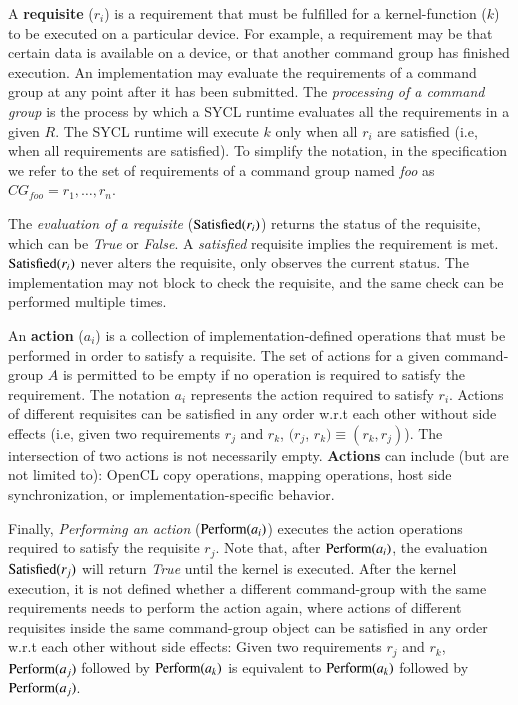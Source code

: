 A \textbf{requisite} ($r_i$) is a requirement that must be fulfilled for
a kernel-function ($k$) to be executed on a particular device.
For example, a requirement may be that certain data is available on a
device, or that another command group has finished execution.
An implementation may evaluate the requirements of a command group at any
point after it has been submitted. 
The \textit{processing of a command group} is the process by which a SYCL
runtime evaluates all the requirements in a given $R$.
The SYCL runtime will execute $k$ only when all $r_i$ are satisfied (i.e, 
when all requirements are satisfied). 
To simplify the notation, in the specification we refer to the set of
requirements of a command group named \textit{foo} as 
$CG_{foo} = { r_1,\ldots,r_n }$.

The \textit{evaluation of a requisite} ($\operatorname{Satisfied}(r_i)$) returns the status of
the requisite, which can be \emph{True} or \emph{False}.
A \emph{satisfied} requisite implies the requirement is met.
$\operatorname{Satisfied}(r_i)$ never alters the requisite, only observes the current status.
The implementation may not block to check the requisite, and the same check
can be performed multiple times.

An \textbf{action} ($a_i$) is a collection of implementation-defined 
operations that must be performed in order to satisfy a requisite. 
The set of actions for a given \gls{command-group} $A$ is permitted 
to be empty if no operation is required to satisfy the requirement. 
The notation $a_i$ represents the action required to satisfy $r_i$. 
Actions of different requisites can be satisfied in any order w.r.t 
each other without side effects (i.e, given two requirements $r_j$ and $r_k$,
$(r_j$, $r_k)\equiv(r_k, r_j)$). The intersection of two
actions is not necessarily empty.
\textbf{Actions} can include (but are not limited to): OpenCL copy operations,
mapping operations, host side synchronization, or implementation-specific 
behavior.

Finally, \textit{Performing an action} ($\operatorname{Perform}(a_i)$) executes the 
action operations required to satisfy the requisite $r_j$.
Note that, after $\operatorname{Perform}(a_i)$, the evaluation $\operatorname{Satisfied}(r_j)$ will return
\emph{True} until the kernel is executed.
After the kernel execution, it is not defined whether a different 
\gls{command-group} with the same requirements needs to perform the
action again, where 
actions of different requisites inside the same \gls{command-group} object can
be satisfied in any order w.r.t each other without side effects:
Given two requirements $r_j$ and $r_k$, $\operatorname{Perform}(a_j)$ followed by $\operatorname{Perform}(a_k)$ 
is equivalent to $\operatorname{Perform}(a_k)$ followed by $\operatorname{Perform}(a_j)$.

